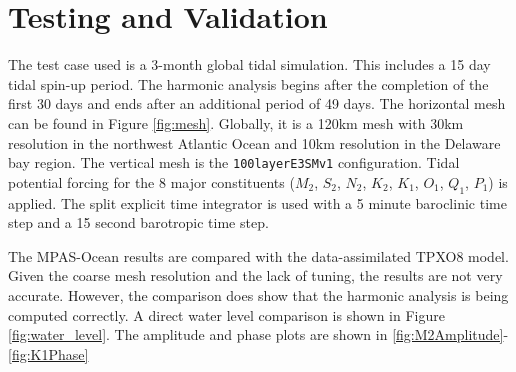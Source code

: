 \documentclass[11pt]{report}
\begin{document}

\chapter{Testing and Validation}

The test case used is a 3-month global tidal simulation. This includes a 15 day tidal spin-up period. The harmonic analysis begins after the completion of the first 30 days and ends after an additional period of 49 days. The horizontal mesh can be found in Figure \ref{fig:mesh}. Globally, it is a 120km mesh with 30km resolution in the northwest Atlantic Ocean and 10km resolution in the Delaware bay region. The vertical mesh is the {\tt 100layerE3SMv1} configuration. Tidal potential forcing for the 8 major constituents ($M_2$, $S_2$, $N_2$, $K_2$, $K_1$, $O_1$, $Q_1$, $P_1$) is applied. The split explicit time integrator is used with a 5 minute baroclinic time step and a 15 second barotropic time step.

The MPAS-Ocean results are compared with the data-assimilated TPXO8 model. Given the coarse mesh resolution and the lack of tuning, the results are not very accurate. However, the comparison does show that the harmonic analysis is being computed correctly. A direct water level comparison is shown in Figure \ref{fig:water_level}. The amplitude and phase plots are shown in \ref{fig:M2Amplitude}-\ref{fig:K1Phase} 
\end{document}
